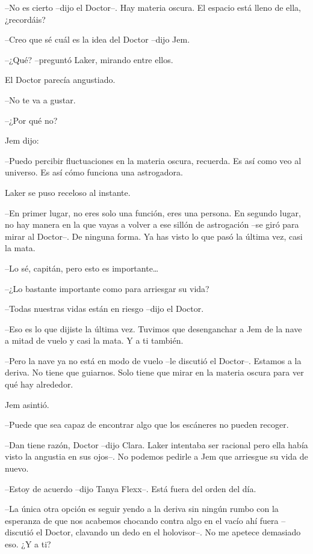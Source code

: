 {--No es cierto --dijo el Doctor--. Hay materia oscura. El espacio está
lleno de ella, ¿recordáis?}

{--Creo que sé cuál es la idea del Doctor --dijo Jem.}

{--¿Qué? --preguntó Laker, mirando entre ellos.}

{El Doctor parecía angustiado.}

{--No te va a gustar.}

{--¿Por qué no?}

{Jem dijo:}

{--Puedo percibir fluctuaciones en la materia oscura, recuerda. Es así
como veo al universo. Es así cómo funciona una astrogadora.}

{Laker se puso receloso al instante.}

{--En primer lugar, no eres solo una función, eres una persona. En
 segundo lugar, no hay manera en la que vayas a volver a ese sillón de
 astrogación --se giró para mirar al Doctor--. De ninguna forma. Ya has
visto lo que pasó la última vez, casi la mata.}

{--Lo sé, capitán, pero esto es importante\ldots{}}

{--¿Lo bastante importante como para arriesgar su vida?}

{--Todas nuestras vidas están en riesgo --dijo el Doctor.}

{--Eso es lo que dijiste la última vez. Tuvimos que desenganchar a Jem de
la nave a mitad de vuelo y casi la mata. Y a ti también.}

{--Pero la nave ya no está en modo de vuelo --le discutió el Doctor--.
 Estamos a la deriva. No tiene que guiarnos. Solo tiene que mirar en la
materia oscura para ver qué hay alrededor.}

{Jem asintió.}

{--Puede que sea capaz de encontrar algo que los escáneres no pueden
recoger.}

{--Dan tiene razón, Doctor --dijo Clara. Laker intentaba ser racional
 pero ella había visto la angustia en sus ojos--. No podemos pedirle a
Jem que arriesgue su vida de nuevo.}

{--Estoy de acuerdo --dijo Tanya Flexx--. Está fuera del orden del día.}

{--La única otra opción es seguir yendo a la deriva sin ningún rumbo con
 la esperanza de que nos acabemos chocando contra algo en el vacío ahí
 fuera --discutió el Doctor, clavando un dedo en el holovisor--. No me
apetece demasiado eso. ¿Y a ti?}

